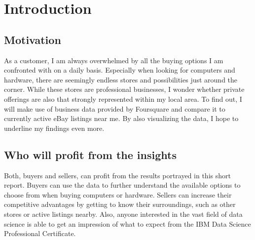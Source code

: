 \chapter{Introduction}
\section{Motivation}
As a customer, I am always overwhelmed by all the buying options I am confronted with on a daily basis. Especially when looking for computers and hardware, there are seemingly endless stores and possibilities just around the corner. While these stores are professional businesses, I wonder whether private offerings are also that strongly represented within my local area. To find out, I will make use of business data provided by Foursquare and compare it to currently active eBay listings near me. By also visualizing the data, I hope to underline my findings even more.
\section{Who will profit from the insights}
Both, buyers and sellers, can profit from the results portrayed in this short report. Buyers can use the data to further understand the available options to choose from when buying computers or hardware. Sellers can increase their competitive advantages by getting to know their surroundings, such as other stores or active listings nearby. Also, anyone interested in the vast field of data science is able to get an impression of what to expect from the IBM Data Science Professional Certificate.